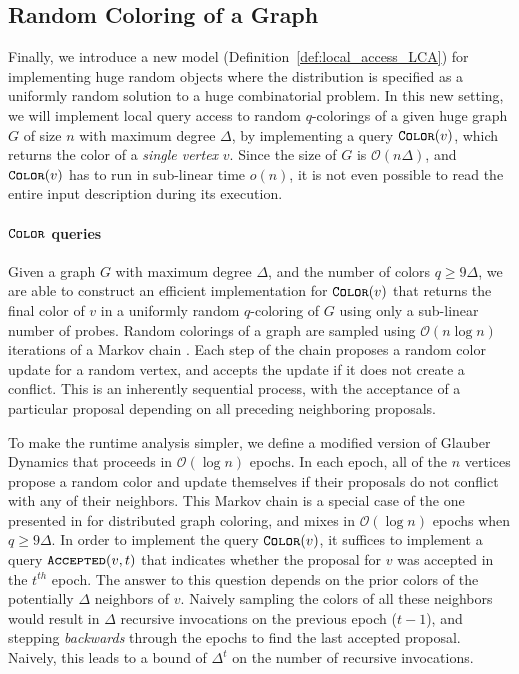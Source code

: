 \subsection{Random Coloring of a Graph}
\label{sec:overview_random_coloring_of_a_graph}
Finally, we introduce a new model (Definition~\ref{def:local_access_LCA}) for implementing huge random objects
where the distribution is specified as a uniformly random solution to a huge combinatorial problem.
In this new setting, we will implement local query access to random $q$-colorings of a given huge graph $G$ of size $n$ with maximum degree $\Delta$,
by implementing a query $\texttt{\textsc{Color}}(v)$, which returns the color of a \emph{single vertex} $v$.
Since the size of $G$ is $\mathcal O(n\Delta)$, and $\texttt{\textsc{Color}}(v)$ has to run in sub-linear time $o(n)$,
it is not even possible to read the entire input description during its execution.


\paragraph*{$\texttt{\textsc{Color}}$ queries}
\label{par:color_queries}
Given a graph $G$ with maximum degree $\Delta$, and the number of colors $q\ge 9\Delta$,
we are able to construct an efficient implementation for $\texttt{\textsc{Color}}(v)$ that returns the final color of $v$
in a uniformly random $q$-coloring of $G$ using only a sub-linear number of probes.
Random colorings of a graph are sampled using $\mathcal O(n\log n)$ iterations of a Markov chain \cite{glauber_survey}.
Each step of the chain proposes a random color update for a random vertex, and accepts the update if it does not create a conflict.
This is an inherently sequential process, with the acceptance of a particular proposal depending on all preceding neighboring proposals.

To make the runtime analysis simpler, we define a modified version of Glauber Dynamics that proceeds in $\mathcal O(\log n)$ epochs.
In each epoch, all of the $n$ vertices propose a random color and update themselves if their proposals do not conflict with any of their neighbors.
This Markov chain is a special case of the one presented in \cite{ghaffari_fischer} for distributed graph coloring,
and mixes in $\mathcal O(\log n)$ epochs when $q\ge 9\Delta$.
In order to implement the query $\texttt{\textsc{Color}}(v)$, it suffices to implement a query $\texttt{\textsc{Accepted}}(v,t)$
that indicates whether the proposal for $v$ was accepted in the $t^{th}$ epoch.
The answer to this question depends on the prior colors of the potentially $\Delta$ neighbors of $v$.
Naively sampling the colors of all these neighbors would result in $\Delta$ recursive invocations on the previous epoch ($t-1$),
and stepping \emph{backwards} through the epochs to find the last accepted proposal.
Naively, this leads to a bound of $\Delta^t$ on the number of recursive invocations.

